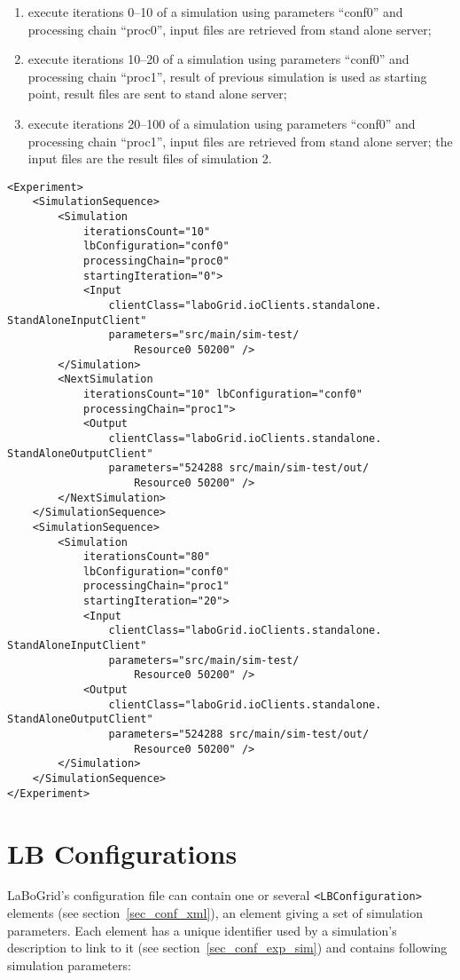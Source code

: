 \begin{enumerate}
	\item execute iterations 0--10 of a simulation using parameters ``conf0'' and
	processing chain ``proc0'', input files are retrieved from stand alone server;
	\item execute iterations 10--20 of a simulation using parameters ``conf0'' and
	processing chain ``proc1'', result of previous simulation is used as starting
	point, result files are sent to stand alone server;
	\item execute iterations 20--100 of a simulation using parameters ``conf0'' and
	processing chain ``proc1'', input files are retrieved from stand alone server;
	the input files are the result files of simulation 2.
\end{enumerate}

\begin{Verbatim}[tabsize=2,frame=lines]
<Experiment>
	<SimulationSequence>
		<Simulation
			iterationsCount="10"
			lbConfiguration="conf0"
			processingChain="proc0"
			startingIteration="0">
			<Input
				clientClass="laboGrid.ioClients.standalone.
StandAloneInputClient"
				parameters="src/main/sim-test/
					Resource0 50200" />
		</Simulation>
		<NextSimulation
			iterationsCount="10" lbConfiguration="conf0"
			processingChain="proc1">
			<Output
				clientClass="laboGrid.ioClients.standalone.
StandAloneOutputClient"
				parameters="524288 src/main/sim-test/out/
					Resource0 50200" />
		</NextSimulation>
	</SimulationSequence>
	<SimulationSequence>
		<Simulation
			iterationsCount="80"
			lbConfiguration="conf0"
			processingChain="proc1"
			startingIteration="20">
			<Input
				clientClass="laboGrid.ioClients.standalone.
StandAloneInputClient"
				parameters="src/main/sim-test/
					Resource0 50200" />
			<Output
				clientClass="laboGrid.ioClients.standalone.
StandAloneOutputClient"
				parameters="524288 src/main/sim-test/out/
					Resource0 50200" />
		</Simulation>
	</SimulationSequence>
</Experiment>
\end{Verbatim}


\section{LB Configurations}
\label{sec_conf_lbConf}

LaBoGrid's configuration file can contain one or several
\verb|<LBConfiguration>| elements (see section~\ref{sec_conf_xml}), an element
giving a set of simulation parameters. Each element has a unique identifier
used by a simulation's description to link to it (see
section~\ref{sec_conf_exp_sim}) and contains following simulation parameters:

